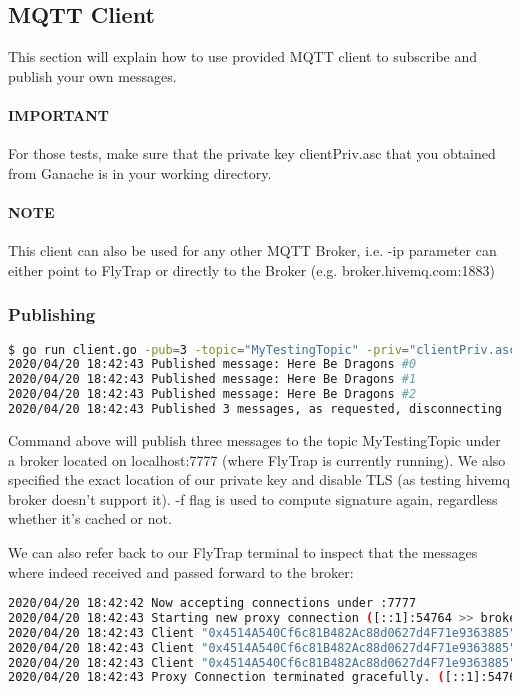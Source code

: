 \subsection{MQTT Client}
This section will explain how to use provided MQTT client to subscribe and publish your own messages. 

\paragraph{IMPORTANT} For those tests, make sure that the private key clientPriv.asc that you obtained from Ganache is in your working directory.
\paragraph{NOTE} This client can also be used for any other MQTT Broker, i.e. -ip parameter can either point to FlyTrap or directly to the Broker (e.g. broker.hivemq.com:1883)
\subsubsection{Publishing}
\begin{lstlisting}[language=bash,breaklines=true]
$ go run client.go -pub=3 -topic="MyTestingTopic" -priv="clientPriv.asc" -ip="localhost:7777" -tls=false -f
2020/04/20 18:42:43 Published message: Here Be Dragons #0
2020/04/20 18:42:43 Published message: Here Be Dragons #1
2020/04/20 18:42:43 Published message: Here Be Dragons #2
2020/04/20 18:42:43 Published 3 messages, as requested, disconnecting
\end{lstlisting}
Command above will publish three messages to the topic MyTestingTopic under a broker located on localhost:7777 (where FlyTrap is currently running). We also specified the exact location of our private key and disable TLS (as testing hivemq broker doesn't support it). -f flag is used to compute signature again, regardless whether it's cached or not.

We can also refer back to our FlyTrap terminal to inspect that the messages where indeed received and passed forward to the broker:
\begin{lstlisting}[language=bash,breaklines=true]
2020/04/20 18:42:42 Now accepting connections under :7777
2020/04/20 18:42:43 Starting new proxy connection ([::1]:54764 >> broker.hivemq.com:1883)
2020/04/20 18:42:43 Client "0x4514A540Cf6c81B482Ac88d0627d4F71e9363885" was authorised to publish to topic "MyTestingTopic"
2020/04/20 18:42:43 Client "0x4514A540Cf6c81B482Ac88d0627d4F71e9363885" was already authorised to publish to topic "MyTestingTopic"
2020/04/20 18:42:43 Client "0x4514A540Cf6c81B482Ac88d0627d4F71e9363885" was already authorised to publish to topic "MyTestingTopic"
2020/04/20 18:42:43 Proxy Connection terminated gracefully. ([::1]:54764 >> broker.hivemq.com:1883)
\end{lstlisting}

